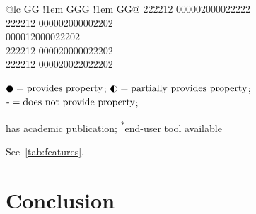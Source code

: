 \begin{table}
\begin{threeparttable}
\begin{tabular}{@{}lc GG !{\kern1em} GGG !{\kern1em} GG@{}}
        {222}{212} {000}{002}{000}{022}{222}\\
  {222}{212} {000}{002}{000}{002}{202}\\
 {000}{012}{000}{022}{202}\\
             {222}{212} {000}{020}{000}{022}{202}\\
          {222}{212} {000}{020}{022}{022}{202}\\
\bottomrule
\end{tabular}
\begin{tablenotes}
\item \hfil$\feature2=\text{provides property}$; $\feature1=\text{partially provides property}$;
$\text{\feature0}=\text{does not provide property}$;
\item \hfil\textsuperscript{\dag}has academic publication;
\textsuperscript{*}end-user tool available
\end{tablenotes}    \end{threeparttable}

\end{table}

See~\ref{tab:features}.

\section{Conclusion}
